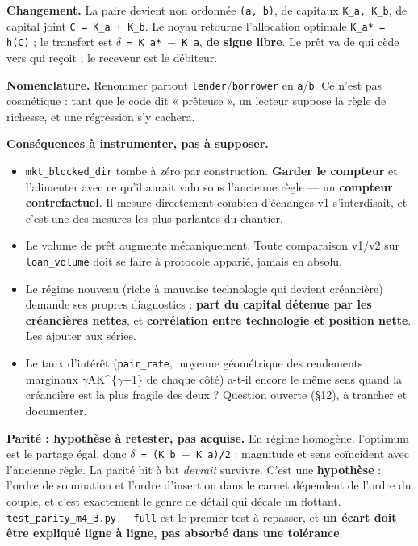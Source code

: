 \documentclass[11pt,a4paper]{article}
\newcommand{\code}[1]{\texttt{#1}}
\begin{document}
\textbf{Changement.} La paire devient non ordonnée \code{(a, b)}, de capitaux \code{K\_a, K\_b}, de capital joint \code{C = K\_a + K\_b}. Le noyau retourne l'allocation optimale \code{K\_a* = h(C)} ; le transfert est \code{\ensuremath{\delta} = K\_a* \ensuremath{-} K\_a}, \textbf{de signe libre}. Le prêt va de qui cède vers qui reçoit ; le receveur est le débiteur.

\textbf{Nomenclature.} Renommer partout \code{lender}/\code{borrower} en \code{a}/\code{b}. Ce n'est pas cosmétique : tant que le code dit « prêteuse », un lecteur suppose la règle de richesse, et une régression s'y cachera.

\textbf{Conséquences à instrumenter, pas à supposer.}

\begin{itemize}
\item \code{mkt\_blocked\_dir} tombe à zéro par construction. \textbf{Garder le compteur} et l'alimenter avec ce qu'il aurait valu sous l'ancienne règle --- un \textbf{compteur contrefactuel}. Il mesure directement combien d'échanges v1 s'interdisait, et c'est une des mesures les plus parlantes du chantier.
\item Le volume de prêt augmente mécaniquement. Toute comparaison v1/v2 sur \code{loan\_volume} doit se faire à protocole apparié, jamais en absolu.
\item Le régime nouveau (riche à mauvaise technologie qui devient créancière) demande ses propres diagnostics : \textbf{part du capital détenue par les créancières nettes}, et \textbf{corrélation entre technologie et position nette}. Les ajouter aux séries.
\item Le taux d'intérêt (\code{pair\_rate}, moyenne géométrique des rendements marginaux \ensuremath{\gamma}AK\textasciicircum{}\{\ensuremath{\gamma}\ensuremath{-}1\} de chaque côté) a-t-il encore le même sens quand la créancière est la plus fragile des deux ? Question ouverte (§12), à trancher et documenter.
\end{itemize}

\textbf{Parité : hypothèse à retester, pas acquise.} En régime homogène, l'optimum est le partage égal, donc \code{\ensuremath{\delta} = (K\_b \ensuremath{-} K\_a)/2} : magnitude et sens coïncident avec l'ancienne règle. La parité bit à bit \emph{devrait} survivre. C'est une \textbf{hypothèse} : l'ordre de sommation et l'ordre d'insertion dans le carnet dépendent de l'ordre du couple, et c'est exactement le genre de détail qui décale un flottant. \code{test\_parity\_m4\_3.py -{}-full} est le premier test à repasser, et \textbf{un écart doit être expliqué ligne à ligne, pas absorbé dans une tolérance}.
\end{document}
